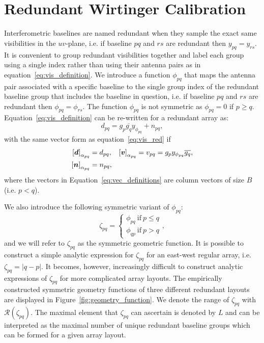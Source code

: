 \documentclass[useAMS,usenatbib]{mn2e}
\newcommand{\bd}{\bmath{d}}
\newcommand{\bv}{\bmath{v}}
\newcommand{\bn}{\bmath{n}}
\newcommand{\conj}[1]{\overline{#1}}
\begin{document}
\section{Redundant Wirtinger Calibration}
\label{sec:red_wirtinger}
Interferometric baselines are named redundant when they sample the exact same visibilities in the $uv$-plane, i.e. if baseline $pq$ and $rs$ are redundant then $y_{pq} = y_{rs}$. It is convenient to group redundant visibilities together and label each group using a single index rather than using their antenna pairs as in equation~\ref{eq:vis_definition}. We introduce a function $\phi_{pq}$ that maps the antenna pair associated with a specific baseline to the single group index of the redundant baseline group that includes the baseline in question, i.e. if baseline $pq$ and $rs$ are redundant then $\phi_{pq} = \phi_{rs}$. The function $\phi_{pq}$ is not symmetric as $\phi_{pq} = 0$ if $p \geq q$. Equation~\ref{eq:vis_definition} can be re-written for a redundant array as:
\begin{equation}
\label{eq:vis_red}
d_{pq} = g_{p}\conj{g_q}y_{\phi_{pq}} + n_{pq},
\end{equation}
with the same vector form as equation~\ref{eq:vis_red} if
\begin{align}
 \left [ \bd \right]_{\alpha_{pq}} &= d_{pq}, & \left [ \bv \right ]_{\alpha_{pq}} &= v_{pq}=g_p y_{\phi_{pq}} \conj{g_q},\nonumber\\
 \left [ \bn \right ]_{\alpha_{pq}} &= n_{pq}, &  &\label{eq:vec_definitions}
\end{align}
where the vectors in Equation~\ref{eq:vec_definitions} are column vectors of size $B$ (i.e. $p<q$).

We also introduce the following symmetric variant of $\phi_{pq}$:
\begin{equation}
\zeta_{pq} = 
\begin{cases}
\phi_{pq}~\textrm{if}~p \leq q\\
\phi_{qp}~\textrm{if}~p>q
\end{cases},
\end{equation} 
and we will refer to $\zeta_{pq}$ as the symmetric geometric function.
It is possible to construct a simple analytic expression for $\zeta_{pq}$ for an east-west regular array, i.e. $\zeta_{pq} = |q-p|$. It becomes, however, increasingly difficult to construct analytic expressions of $\zeta_{pq}$ for more complicated array layouts. The empirically constructed symmetric geometry functions of three different redundant layouts are displayed in Figure~\ref{fig:geometry_function}. We denote the range of $\zeta_{pq}$ with $\mathcal{R}(\zeta_{pq})$. The maximal element that $\zeta_{pq}$ can ascertain is denoted by $L$ and can be interpreted as the maximal number of unique redundant baseline groups which can be formed for a given array layout. 
\end{document}
